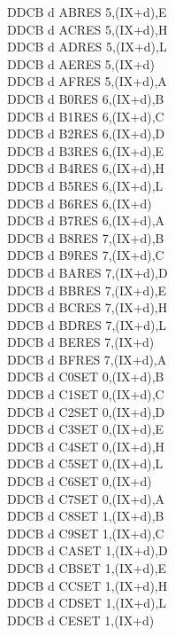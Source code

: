 \documentclass[12pt,twoside,openright,a4paper]{book}
\begin{document}
\begin{multicols}{3}
{\begin{tabbing}
	DDCB d AB\>RES 5,(IX+d),E\UNDOC\\
	DDCB d AC\>RES 5,(IX+d),H\UNDOC\\
	DDCB d AD\>RES 5,(IX+d),L\UNDOC\\
	DDCB d AE\>RES 5,(IX+d)\\
	DDCB d AF\>RES 5,(IX+d),A\UNDOC\\
	DDCB d B0\>RES 6,(IX+d),B\UNDOC\\
	DDCB d B1\>RES 6,(IX+d),C\UNDOC\\
	DDCB d B2\>RES 6,(IX+d),D\UNDOC\\
	DDCB d B3\>RES 6,(IX+d),E\UNDOC\\
	DDCB d B4\>RES 6,(IX+d),H\UNDOC\\
	DDCB d B5\>RES 6,(IX+d),L\UNDOC\\
	DDCB d B6\>RES 6,(IX+d)\\
	DDCB d B7\>RES 6,(IX+d),A\UNDOC\\
	DDCB d B8\>RES 7,(IX+d),B\UNDOC\\
	DDCB d B9\>RES 7,(IX+d),C\UNDOC\\
	DDCB d BA\>RES 7,(IX+d),D\UNDOC\\
	DDCB d BB\>RES 7,(IX+d),E\UNDOC\\
	DDCB d BC\>RES 7,(IX+d),H\UNDOC\\
	DDCB d BD\>RES 7,(IX+d),L\UNDOC\\
	DDCB d BE\>RES 7,(IX+d)\\
	DDCB d BF\>RES 7,(IX+d),A\UNDOC\\
	DDCB d C0\>SET 0,(IX+d),B\UNDOC\\
	DDCB d C1\>SET 0,(IX+d),C\UNDOC\\
	DDCB d C2\>SET 0,(IX+d),D\UNDOC\\
	DDCB d C3\>SET 0,(IX+d),E\UNDOC\\
	DDCB d C4\>SET 0,(IX+d),H\UNDOC\\
	DDCB d C5\>SET 0,(IX+d),L\UNDOC\\
	DDCB d C6\>SET 0,(IX+d)\\
	DDCB d C7\>SET 0,(IX+d),A\UNDOC\\
	DDCB d C8\>SET 1,(IX+d),B\UNDOC\\
	DDCB d C9\>SET 1,(IX+d),C\UNDOC\\
	DDCB d CA\>SET 1,(IX+d),D\UNDOC\\
	DDCB d CB\>SET 1,(IX+d),E\UNDOC\\
	DDCB d CC\>SET 1,(IX+d),H\UNDOC\\
	DDCB d CD\>SET 1,(IX+d),L\UNDOC\\
	DDCB d CE\>SET 1,(IX+d)\\

\end{tabbing}}
\end{multicols}
\end{document}
